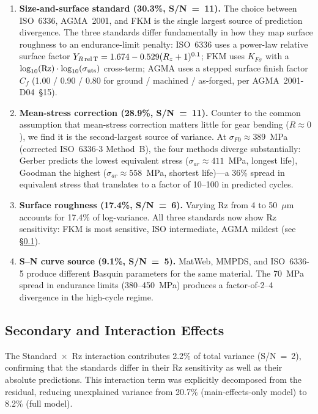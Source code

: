\documentclass[12pt,a4paper]{article}
\begin{document}
\begin{enumerate}
  \item \textbf{Size-and-surface standard (30.3\%, S/N~=~11).} The
        choice between ISO~6336, AGMA~2001, and FKM is the single
        largest source of prediction divergence. The three standards
        differ fundamentally in how they map surface roughness to an
        endurance-limit penalty: ISO~6336 uses a power-law relative surface
        factor $Y_{R\,\rm rel\,T} = 1.674 - 0.529(R_z+1)^{0.1}$;
        FKM uses $K_{F\sigma}$ with a $\log_{10}(\mathrm{Rz}) \cdot
        \log_{10}(\sigma_{\rm uts})$ cross-term; AGMA uses a stepped
        surface finish factor $C_f$ (1.00 / 0.90 / 0.80 for
        ground / machined / as-forged, per AGMA~2001-D04~\S15).

  \item \textbf{Mean-stress correction (28.9\%, S/N~=~11).}
        Counter to the common assumption that mean-stress correction matters
        little for gear bending ($R \approx 0$), we find it is the
        second-largest source of variance. At $\sigma_{F0} \approx 389$~MPa
        (corrected ISO~6336-3 Method~B), the four methods diverge
        substantially: Gerber predicts the lowest equivalent stress
        ($\sigma_{ar} \approx 411$~MPa, longest life), Goodman the highest
        ($\sigma_{ar} \approx 558$~MPa, shortest life)---a 36\% spread in
        equivalent stress that translates to a factor of 10--100 in
        predicted cycles.

  \item \textbf{Surface roughness (17.4\%, S/N~=~6).} Varying Rz from
        4 to 50~$\mu$m accounts for 17.4\% of log-variance. All three
        standards now show Rz sensitivity: FKM is most sensitive, ISO
        intermediate, AGMA mildest (see \S\ref{sec:interaction}).

  \item \textbf{S--N curve source (9.1\%, S/N~=~5).} MatWeb, MMPDS, and
        ISO~6336-5 produce different Basquin parameters for the same
        material. The 70~MPa spread in endurance limits (380--450~MPa)
        produces a factor-of-2--4 divergence in the high-cycle regime.
\end{enumerate}

\subsection{Secondary and Interaction Effects}
\label{sec:interaction}

The Standard~$\times$~Rz interaction contributes 2.2\% of total variance
(S/N~=~2), confirming that the standards differ in their Rz sensitivity as
well as their absolute predictions. This interaction term was explicitly
decomposed from the residual, reducing unexplained variance from 20.7\% (main-effects-only model) to 8.2\% (full model).
\end{document}

